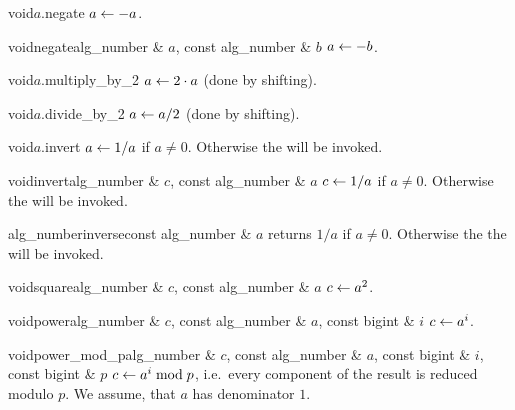 \begin{fcode}{void}{$a$.negate}{}
  $a \leftarrow -a$.
\end{fcode}

\begin{fcode}{void}{negate}{alg_number & $a$, const alg_number & $b$}
  $a \leftarrow -b$.
\end{fcode}

\begin{fcode}{void}{$a$.multiply_by_2}{}
  $a \leftarrow 2 \cdot a$ (done by shifting).
\end{fcode}

\begin{fcode}{void}{$a$.divide_by_2}{}
  $a \leftarrow a / 2$ (done by shifting).
\end{fcode}

\begin{fcode}{void}{$a$.invert}{}
  $a \leftarrow 1 / a$ if $a \neq 0$.  Otherwise the \LEH will be invoked.
\end{fcode}

\begin{fcode}{void}{invert}{alg_number & $c$, const alg_number & $a$}
  $c \leftarrow 1 / a$ if $a \neq 0$.  Otherwise the \LEH will be invoked.
\end{fcode}

\begin{fcode}{alg_number}{inverse}{const alg_number & $a$}
  returns $1 / a$ if $a \neq 0$.  Otherwise the the \LEH will be invoked.
\end{fcode}

\begin{fcode}{void}{square}{alg_number & $c$, const alg_number & $a$}
  $c \leftarrow a^2$.
\end{fcode}

\begin{fcode}{void}{power}{alg_number & $c$, const alg_number & $a$, const bigint & $i$}
  $c \leftarrow a^i$.
\end{fcode}

\begin{fcode}{void}{power_mod_p}{alg_number & $c$, const alg_number & $a$,
    const bigint & $i$, const bigint & $p$}%
  $c \leftarrow a^i \bmod p$, i.e.~every component of the result is reduced modulo $p$.  We assume,
  that $a$ has denominator $1$.
\end{fcode}



\COMP

